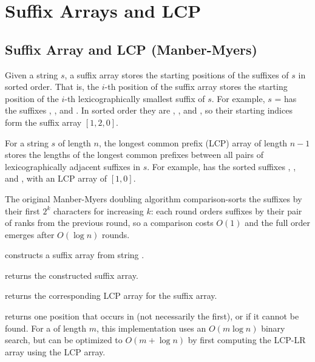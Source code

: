 \section{\texorpdfstring{Suffix Arrays and LCP}{3.4 Suffix Arrays and LCP}}
\setcounter{section}{4}
\setcounter{subsection}{0}
\subsection{Suffix Array and LCP (Manber-Myers)}
\label{sec:3.4.1}
Given a string $s$, a suffix array stores the starting positions of the suffixes of $s$ in sorted order. That is, the $i$-th position of the suffix array stores the starting position of the $i$-th lexicographically smallest suffix of $s$. For example, $s$ =  has the suffixes , , and . In sorted order they are , , and , so their starting indices form the suffix array $[1, 2, 0]$.

For a string $s$ of length $n$, the longest common prefix (LCP) array of length $n - 1$ stores the lengths of the longest common prefixes between all pairs of lexicographically adjacent suffixes in $s$. For example,  has the sorted suffixes , , and , with an LCP array of $[1, 0]$.

The original Manber-Myers doubling algorithm comparison-sorts the suffixes by their first $2^k$ characters for increasing $k$: each round orders suffixes by their pair of ranks from the previous round, so a comparison costs $O(1)$ and the full order emerges after $O(\log n)$ rounds.

\begin{compactitem}
  \item {} constructs a suffix array from string .
  \item {} returns the constructed suffix array.
  \item {} returns the corresponding LCP array for the suffix array.
  \item {} returns one position that  occurs in  (not necessarily the first), or  if it cannot be found. For a  of length $m$, this implementation uses an $O(m \log n)$ binary search, but can be optimized to $O(m + \log n)$ by first computing the LCP-LR array using the LCP array.
\end{compactitem}

